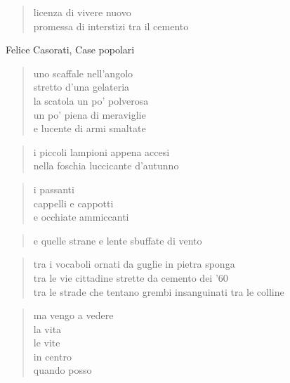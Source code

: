 	\begin{verse}
		licenza di vivere nuovo\\
		promessa di interstizi tra il cemento
	\end{verse}

\clearpage


\begin{artItem}
	Felice Casorati, Case popolari
\end{artItem}

	\begin{verse}
		uno scaffale nell'angolo\\
		stretto d'una gelateria\\
		la scatola un po' polverosa\\
		un po' piena di meraviglie\\
		e lucente di armi smaltate
	\end{verse}

	\begin{verse}
		i piccoli lampioni appena accesi\\
		nella foschia luccicante d'autunno
	\end{verse}

	\begin{verse}
		i passanti\\
		cappelli e cappotti\\
		e occhiate ammiccanti
	\end{verse}

	\begin{verse}
		e quelle strane e lente sbuffate di vento
	\end{verse}

	\begin{verse}
		tra i vocaboli ornati da guglie in pietra sponga\\
		tra le vie cittadine strette da cemento dei '60\\
		tra le strade che tentano grembi insanguinati tra le colline
	\end{verse}

	\begin{verse}
		ma vengo a vedere\\
		la vita\\
		le vite\\
		in centro\\
		quando posso
	\end{verse}

\clearpage


